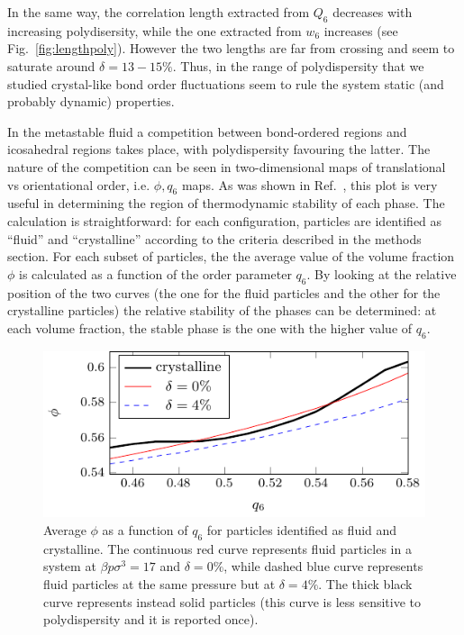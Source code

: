 \documentclass[twocolumn,superscriptaddress]{revtex4-1}
\begin{document}
In the same way, the correlation length extracted from $Q_6$ decreases with increasing polydisersity, while the one extracted from $w_6$ increases (see Fig.~\ref{fig:lengthpoly}). However the two lengths are far from crossing and seem to saturate around $\delta=13-15\%$. Thus, in the range of polydispersity that we studied crystal-like bond order fluctuations seem to rule the system static (and probably dynamic) properties.


In the metastable fluid a competition between bond-ordered regions and icosahedral regions takes
place, with polydispersity favouring the latter. The nature of the competition can be seen
in two-dimensional maps of translational vs orientational order, i.e. $\phi,q_6$ maps.
As was shown in Ref.~\cite{russo_hs}, this plot is very useful in determining the region
of thermodynamic stability of each phase. The calculation is straightforward: for each
configuration, particles are identified as ``fluid'' and ``crystalline'' according to
the criteria described in the methods section. For each subset of particles, the
the average value of the volume fraction
$\phi$ is calculated as a function of the order parameter $q_6$. By looking at the
relative position of the two curves (the one for the fluid particles and the other for the crystalline particles)
the relative stability of the phases can be determined: at each volume fraction,
the stable phase is the one with the higher value of $q_6$. 

\begin{figure}
 \centering
 \includegraphics{fig_stability_map}
 \caption{Average $\phi$ as a function of $q_6$ for particles identified as fluid and crystalline. The continuous red curve represents fluid particles in a system at $\beta p\sigma^3=17$ and $\delta=0\%$, while dashed blue curve represents fluid particles at the same pressure but at $\delta=4\%$. The thick black curve represents instead solid particles (this curve is less sensitive to polydispersity and it is reported once).}
 \label{fig:stability_map}
\end{figure}
\end{document}
